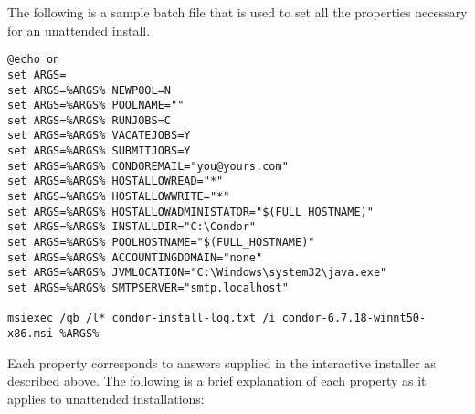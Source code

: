 The following is a sample batch file that is used to set all the
properties necessary for an unattended install.

\begin{verbatim}
@echo on
set ARGS=
set ARGS=%ARGS% NEWPOOL=N
set ARGS=%ARGS% POOLNAME=""
set ARGS=%ARGS% RUNJOBS=C
set ARGS=%ARGS% VACATEJOBS=Y
set ARGS=%ARGS% SUBMITJOBS=Y
set ARGS=%ARGS% CONDOREMAIL="you@yours.com"
set ARGS=%ARGS% HOSTALLOWREAD="*"
set ARGS=%ARGS% HOSTALLOWWRITE="*"
set ARGS=%ARGS% HOSTALLOWADMINISTATOR="$(FULL_HOSTNAME)"
set ARGS=%ARGS% INSTALLDIR="C:\Condor"
set ARGS=%ARGS% POOLHOSTNAME="$(FULL_HOSTNAME)"
set ARGS=%ARGS% ACCOUNTINGDOMAIN="none"
set ARGS=%ARGS% JVMLOCATION="C:\Windows\system32\java.exe"
set ARGS=%ARGS% SMTPSERVER="smtp.localhost"

msiexec /qb /l* condor-install-log.txt /i condor-6.7.18-winnt50-x86.msi %ARGS%
\end{verbatim}

Each property corresponds to answers supplied in the interactive installer
as described above. The following is a brief explanation of each property
as it applies to unattended installations:


